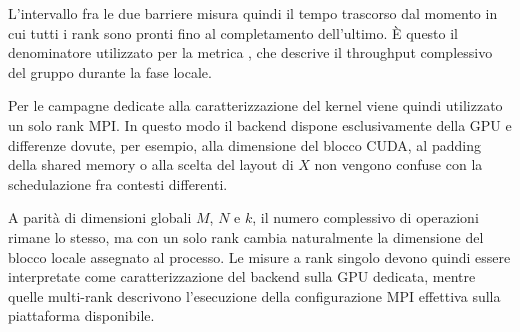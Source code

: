 L'intervallo fra le due barriere misura quindi il tempo trascorso dal
momento in cui tutti i rank sono pronti fino al completamento dell'ultimo.
È questo il denominatore utilizzato per la metrica
, che descrive il throughput complessivo del
gruppo durante la fase locale.

Per le campagne dedicate alla caratterizzazione del kernel viene quindi
utilizzato un solo rank MPI. In questo modo il backend dispone
esclusivamente della GPU e differenze dovute, per esempio, alla dimensione
del blocco CUDA, al padding della shared memory o alla scelta del layout di
$X$ non vengono confuse con la schedulazione fra contesti differenti.

A parità di dimensioni globali $M$, $N$ e $k$, il numero complessivo di
operazioni rimane lo stesso, ma con un solo rank cambia naturalmente la
dimensione del blocco locale assegnato al processo. Le misure a rank
singolo devono quindi essere interpretate come caratterizzazione del
backend sulla GPU dedicata, mentre quelle multi-rank descrivono
l'esecuzione della configurazione MPI effettiva sulla piattaforma
disponibile.
